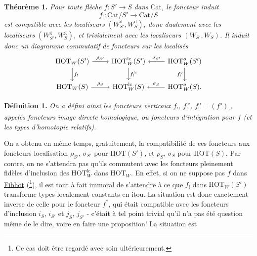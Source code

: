 \documentclass[11pt]{article}
\newcommand{\msp}[1]{\marginpar{\footnotesize [#1]}}
\newcommand{\HOT}{\mathrm{HOT}}
\newcommand{\Cat}{\mathrm{Cat}}
\begin{document}
\textbf{Théorème 1.} \textit{Pour toute flèche $f:S'\longrightarrow S$ dans} Cat\textit{, le foncteur induit}
\[ f_! : \Cat/S' \longrightarrow \Cat/S \]
\textit{est compatible avec les localiseurs $(W_{S'}^{\mathrm{d}},W_S^{\mathrm{d}})$, donc dualement avec les localiseurs $(W_{S'}^{\mathrm{g}},W_S^{\mathrm{g}})$, et trivialement avec les localiseurs $(W_{S'},W_S)$. Il induit donc un diagramme commutatif de foncteurs sur les localisés}
\[
\begin{tikzcd}
\HOT_W(S') \arrow[r, "\rho_{S'}"] \arrow[d, "f_!"] & \HOT_W^{\mathrm{lc}}(S') \arrow[d, "f_!^{\mathrm{lc}}"] & \HOT_W^o(S') \arrow[l, "\sigma_{S'}"'] \arrow[d, "f_!^o"'] \\
\HOT_W(S) \arrow[r, "\rho_S"] & \HOT_W^{\mathrm{lc}}(S) & \HOT_W^o(S). \arrow[l, "\sigma_S"']
\end{tikzcd}
\]

\textbf{Définition 1.} \textit{On a défini ainsi les foncteurs verticaux $f_!$, $f_!^{\mathrm{lc}}$, $f_!^o=(f^o)_!$, appelés foncteurs image directe homologique, ou foncteurs d'intégration pour $f$ (et les types d'homotopie relatifs).}

\msp{page 137}
On a obtenu en même temps, gratuitement, la compatibilité de ces foncteurs aux foncteurs localisation $\rho_{S'}$, $\sigma_{S'}$ pour $\HOT(S')$, et $\rho_S$, $\sigma_S$ pour $\HOT(S)$. Par contre, on ne s'attendra pas qu'ils commutent avec les foncteurs pleinement fidèles d'inclusion des $\HOT_W^{\mathrm{lc}}$ dans $\HOT_W$. En effet, si on ne suppose pas $f$ dans \underline{Fibhot} (\footnote[67]{Ce cas doit être regardé avec soin ultérieurement.}), il est tout à fait immoral de s'attendre à ce que $f_!$ dans $\HOT_W(S')$ transforme types localement constants en itou. La situation est donc exactement inverse de celle pour le foncteur $f^*$, qui était compatible avec les foncteurs d'inclusion $i_S$, $i_{S'}$ et $j_S$, $j_{S'}$ - c'était à tel point trivial qu'il n'a pas été question même de le dire, voire en faire une proposition! La situation est
\end{document}
